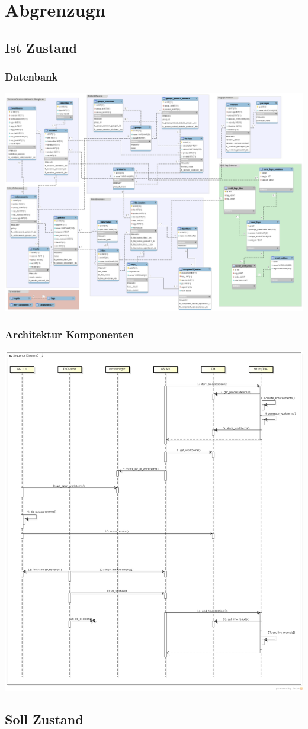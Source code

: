 \chapter{Abgrenzugn}

\section{Ist Zustand}

\subsection{Datenbank}
\includegraphics[scale=0.25, angle=90]{images/db/database-model.png}

\subsection{Architektur Komponenten}
\includegraphics[width=\textwidth]{images/architecture/architecture_sequence_diagramm-2014-03-12}

\section{Soll Zustand}